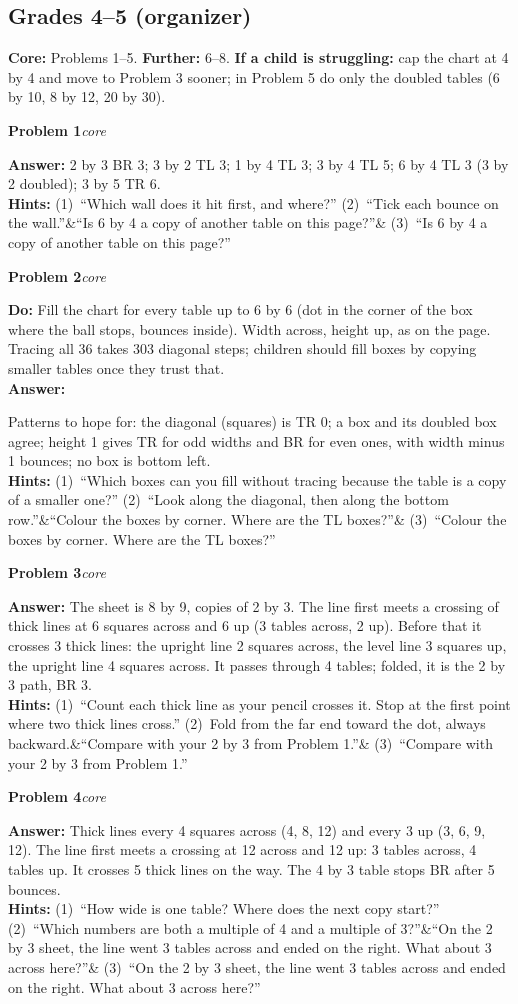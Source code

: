 \documentclass[11pt,letterpaper]{article}
\newcommand{\prob}[3]{\needspace{3\baselineskip}\par\smallskip\textbf{#1}\enspace\textit{#2}\enspace{\small(#3)}\par}
\newcommand{\what}{\textbf{Do:} }
\newcommand{\ans}{\textbf{Answer:} }
\newcommand{\hints}[3]{\textbf{Hints:} (1)~#1 (2)~#2\ifx&#3&\else{} (3)~#3\fi\par}
\newcommand{\core}{core}
\begin{document}
\subsection{Grades 4--5 (organizer)}
\textbf{Core:} Problems 1--5. \textbf{Further:} 6--8. \textbf{If a child is struggling:} cap the chart at 4 by 4 and move to Problem 3 sooner; in Problem 5 do only the doubled tables (6 by 10, 8 by 12, 20 by 30).

\prob{Problem 1}{\core}{page 1}
\ans 2 by 3 BR 3; 3 by 2 TL 3; 1 by 4 TL 3; 3 by 4 TL 5; 6 by 4 TL 3 (3 by 2 doubled); 3 by 5 TR 6.\\
\hints{``Which wall does it hit first, and where?''}{``Tick each bounce on the wall.''}{``Is 6 by 4 a copy of another table on this page?''}

\prob{Problem 2}{\core}{pages 2--3}
\what Fill the chart for every table up to 6 by 6 (dot in the corner of the box where the ball stops, bounces inside). Width across, height up, as on the page. Tracing all 36 takes 303 diagonal steps; children should fill boxes by copying smaller tables once they trust that.\\
\ans
\begin{center}\small\end{center}
Patterns to hope for: the diagonal (squares) is TR 0; a box and its doubled box agree; height 1 gives TR for odd widths and BR for even ones, with width minus 1 bounces; no box is bottom left.\\
\hints{``Which boxes can you fill without tracing because the table is a copy of a smaller one?''}{``Look along the diagonal, then along the bottom row.''}{``Colour the boxes by corner. Where are the TL boxes?''}

\prob{Problem 3}{\core}{page 4}
\ans The sheet is 8 by 9, copies of 2 by 3. The line first meets a crossing of thick lines at 6 squares across and 6 up (3 tables across, 2 up). Before that it crosses 3 thick lines: the upright line 2 squares across, the level line 3 squares up, the upright line 4 squares across. It passes through 4 tables; folded, it is the 2 by 3 path, BR 3.\\
\hints{``Count each thick line as your pencil crosses it. Stop at the first point where two thick lines cross.''}{Fold from the far end toward the dot, always backward.}{``Compare with your 2 by 3 from Problem 1.''}

\prob{Problem 4}{\core}{page 5}
\ans Thick lines every 4 squares across (4, 8, 12) and every 3 up (3, 6, 9, 12). The line first meets a crossing at 12 across and 12 up: 3 tables across, 4 tables up. It crosses 5 thick lines on the way. The 4 by 3 table stops BR after 5 bounces.\\
\hints{``How wide is one table? Where does the next copy start?''}{``Which numbers are both a multiple of 4 and a multiple of 3?''}{``On the 2 by 3 sheet, the line went 3 tables across and ended on the right. What about 3 across here?''}
\end{document}
